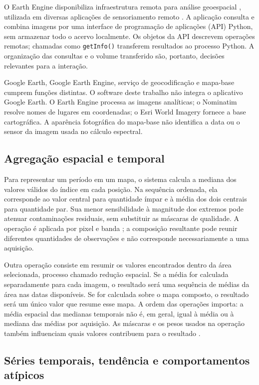 O Earth Engine disponibiliza infraestrutura remota para análise geoespacial \citep{GORELICK2017}, utilizada em diversas aplicações de sensoriamento remoto \citep{AMANI2020}. A aplicação consulta e combina imagens por uma interface de programação de aplicações (API) Python, sem armazenar todo o acervo localmente. Os objetos da API descrevem operações remotas; chamadas como \texttt{getInfo()} transferem resultados ao processo Python. A organização das consultas e o volume transferido são, portanto, decisões relevantes para a interação.

Google Earth, Google Earth Engine, serviço de geocodificação e mapa-base cumprem funções distintas. O software deste trabalho não integra o aplicativo Google Earth. O Earth Engine processa as imagens analíticas; o Nominatim resolve nomes de lugares em coordenadas; o Esri World Imagery fornece a base cartográfica. A aparência fotográfica do mapa-base não identifica a data ou o sensor da imagem usada no cálculo espectral.

\subsection{Agregação espacial e temporal}

Para representar um período em um mapa, o sistema calcula a mediana dos valores válidos do índice em cada posição. Na sequência ordenada, ela corresponde ao valor central para quantidade ímpar e à média dos dois centrais para quantidade par. Sua menor sensibilidade à magnitude dos extremos \citep{NIST_LOCATION} pode atenuar contaminações residuais, sem substituir as máscaras de qualidade. A operação é aplicada por pixel e banda \citep{GOOGLE_EE_MEDIAN}; a composição resultante pode reunir diferentes quantidades de observações e não corresponde necessariamente a uma aquisição.

Outra operação consiste em resumir os valores encontrados dentro da área selecionada, processo chamado redução espacial. Se a média for calculada separadamente para cada imagem, o resultado será uma sequência de médias da área nas datas disponíveis. Se for calculada sobre o mapa composto, o resultado será um único valor que resume esse mapa. A ordem das operações importa: a média espacial das medianas temporais não é, em geral, igual à média ou à mediana das médias por aquisição. As máscaras e os pesos usados na operação também influenciam quais valores contribuem para o resultado \citep{GOOGLE_EE_REDUCE}.

\subsection{Séries temporais, tendência e comportamentos atípicos}

